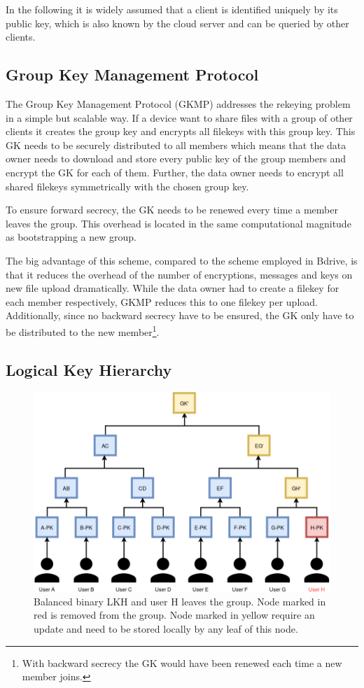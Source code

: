 In the following it is widely assumed that a client is identified uniquely by its public key, which is also known by the cloud server and can be queried by other clients. 

\subsection{Group Key Management Protocol}
The Group Key Management Protocol (\ac{GKMP})\cite{harney1997group} addresses the rekeying problem in a simple but scalable way. If a device want to share files with a group of other clients it creates the group key and encrypts all filekeys with this group key. This \ac{GK} needs to be securely distributed to all members which means that the data owner needs to download and store every public key of the group members and encrypt the \ac{GK} for each of them. Further, the data owner needs to encrypt all shared filekeys symmetrically with the chosen group key. 

To ensure forward secrecy, the \ac{GK} needs to be renewed every time a member leaves the group. This overhead is located in the same computational magnitude as bootstrapping a new group. 

The big advantage of this scheme, compared to the scheme employed in Bdrive, is that it reduces the overhead of the number of encryptions, messages and keys on new file upload dramatically. While the data owner had to create a filekey for each member respectively, \ac{GKMP} reduces this to one filekey per upload. Additionally, since no backward secrecy have to be ensured, the \ac{GK} only have to be distributed to the new member\footnote{With backward secrecy the GK would have been renewed each time a new member joins.}.

\subsection{Logical Key Hierarchy}
\begin{figure}[!ht]
\centering
    \includegraphics[width=0.8\linewidth]{img/LKH.png}
    \caption{Balanced binary \ac{LKH} and user H leaves the group. Node marked in red is removed from the group. Node marked in yellow require an update and need to be stored locally by any leaf of this node. }
    \label{fig:lkh}
\end{figure}

